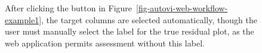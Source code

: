 \documentclass[
doublespace,
  times]{anzsauth}
\begin{document}
\begin{figure}


\caption{\label{fig-autovi-web-workflow-example2}After clicking the
button in Figure~\ref{fig-autovi-web-workflow-example1}, the target
columns are selected automatically, though the user must manually select
the label for the true residual plot, as the web application permits
assessment without this label.}

\end{figure}%
\end{document}

